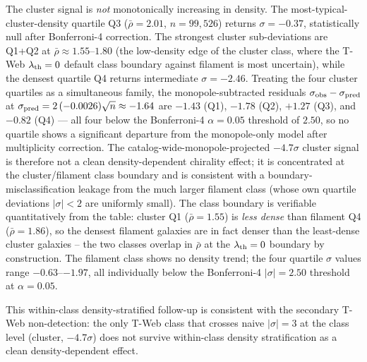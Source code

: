 \documentclass[twocolumn,linenumbers]{aastex702}
\begin{document}
The cluster signal is \emph{not} monotonically increasing in density.
The most-typical-cluster-density quartile Q3 ($\bar\rho = 2.01$,
$n = 99{,}526$) returns $\sigma = -0.37$, statistically null after
Bonferroni-4 correction. The strongest cluster sub-deviations are
Q1+Q2 at $\bar\rho \approx 1.55$--$1.80$ (the low-density edge of
the cluster class, where the T-Web $\lambda_{\rm th} = 0$ default
class boundary against filament is most uncertain), while the densest
quartile Q4 returns intermediate $\sigma = -2.46$. Treating the four
cluster quartiles as a simultaneous family, the monopole-subtracted
residuals $\sigma_{\rm obs} - \sigma_{\rm pred}$ at
$\sigma_{\rm pred} = 2\,(-0.0026)\sqrt{n} \approx -1.64$ are $-1.43$
(Q1), $-1.78$ (Q2), $+1.27$ (Q3), and $-0.82$ (Q4) --- all four below
the Bonferroni-4 $\alpha = 0.05$ threshold of $2.50$, so no quartile
shows a significant departure from the monopole-only model after
multiplicity correction. The catalog-wide-monopole-projected
$-4.7\sigma$ cluster signal is therefore not a clean density-dependent
chirality effect; it is concentrated at the cluster/filament class
boundary and is consistent with a boundary-misclassification leakage
from the much larger filament class (whose own quartile deviations
$|\sigma| < 2$ are uniformly small). The class boundary is verifiable
quantitatively from the table: cluster Q1 ($\bar\rho = 1.55$) is
\emph{less dense} than filament Q4 ($\bar\rho = 1.86$), so the
densest filament galaxies are in fact denser than the least-dense
cluster galaxies -- the two classes overlap in $\bar\rho$ at the
$\lambda_{\rm th} = 0$ boundary by construction. The filament class shows no
density trend; the four quartile $\sigma$ values range
$-0.63$--$-1.97$, all individually below the Bonferroni-4 $|\sigma| =
2.50$ threshold at $\alpha = 0.05$.

This within-class density-stratified follow-up is consistent with the
secondary T-Web non-detection: the only T-Web class that
crosses naive $|\sigma| = 3$ at the class level (cluster, $-4.7\sigma$)
does not survive within-class density stratification as a clean
density-dependent effect.
\end{document}
